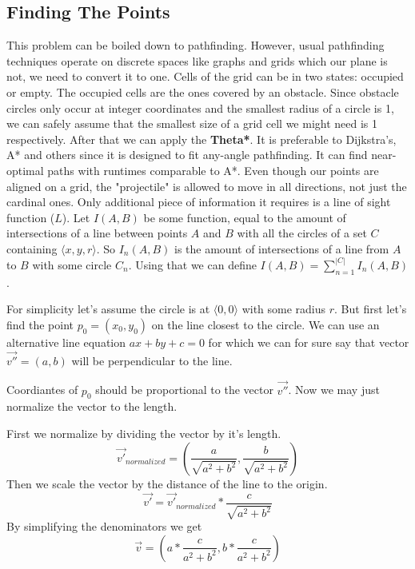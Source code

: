 \documentclass[12pt, titlepage]{article}
\begin{document}
\subsection{Finding The Points}
This problem can be boiled down to pathfinding. However, usual pathfinding
techniques operate on discrete spaces like graphs and grids which our plane
is not, we need to convert it to one. Cells of the grid can be in two states:
occupied or empty. The occupied cells are the ones covered by an obstacle. 
Since obstacle circles only occur at integer coordinates and the smallest
radius of a circle is 1, we can safely assume that the smallest size of a grid
cell we might need is 1 respectively. After that we can apply the \textbf{Theta*}.
It is preferable to Dijkstra's, A* and others since it is designed to fit
any-angle pathfinding. It can find near-optimal paths with runtimes comparable
to A*. Even though our points are aligned on a grid,
the "projectile" is allowed to move in all directions, not just the cardinal ones. 
Only additional piece of information it requires is a line of sight function ($L$).
Let $I(A, B)$ be some function, equal to the amount of intersections of a 
line between points $A$ and $B$  with all the circles of a set $C$ containing 
$\langle x, y, r \rangle$. So $I_n(A, B)$ is the amount of intersections
of a line from $A$ to $B$ with some circle $C_n$. 
Using that we can define $I(A, B) = \sum_{n=1}^{|C|}I_n(A, B)$.

For simplicity let's assume the circle is at $\langle 0, 0 \rangle$ with
some radius $r$.
But first let's find the point $p_0 = (x_0, y_0)$ on the line closest to the circle.
We can use an alternative line equation $ax + by + c = 0$ for which we can for sure say that 
vector $\vec{v''} = (a, b)$ will be perpendicular to the line.

Coordiantes of $p_0$ should be proportional to the vector $\vec{v''}$. 
Now we may just normalize the vector to the length.

First we normalize by dividing the vector by it's length.
\begin{equation}
    \vec{v'}_{normalized}=\left(\frac{a}{\sqrt{a^2 + b^2}}, \frac{b}{\sqrt{a^2 + b^2}} \right)
\end{equation}
Then we scale the vector by the distance of the line to the origin.
\begin{equation}
    \vec{v'}=\vec{v'}_{normalized} * \frac{c}{\sqrt{a^2 + b^2}}
\end{equation}
By simplifying the denominators we get
\begin{equation}
    \vec{v}=\left(a * \frac{c}{a^2 + b^2}, b * \frac{c}{a^2 + b^2}\right)
\end{equation}
\end{document}
